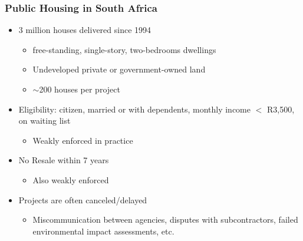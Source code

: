 \documentclass[aspectratio=32]{beamer}
\begin{document}


\begin{frame}
\frametitle{Public Housing in South Africa}
  \begin{itemize}
    \item 3 million houses delivered since 1994
        \begin{itemize}
          \item free-standing, single-story, two-bedrooms dwellings
          \item Undeveloped private or government-owned land
          \item $\sim$200 houses per project
        \end{itemize}
    \vspace{1mm}
    \item Eligibility: citizen, married or with dependents, monthly income $<$ R3,500, on waiting list
      \begin{itemize}
        \item Weakly enforced in practice
      \end{itemize}
    \vspace{1mm}
    \item No Resale within 7 years
      \begin{itemize}
        \item Also weakly enforced
      \end{itemize}
    \vspace{1mm}
    \item Projects are often canceled/delayed
      \begin{itemize}
        \item Miscommunication between agencies, disputes with subcontractors, failed environmental impact assessments, etc.
      \end{itemize}
  \end{itemize}
\end{frame}
\end{document}
